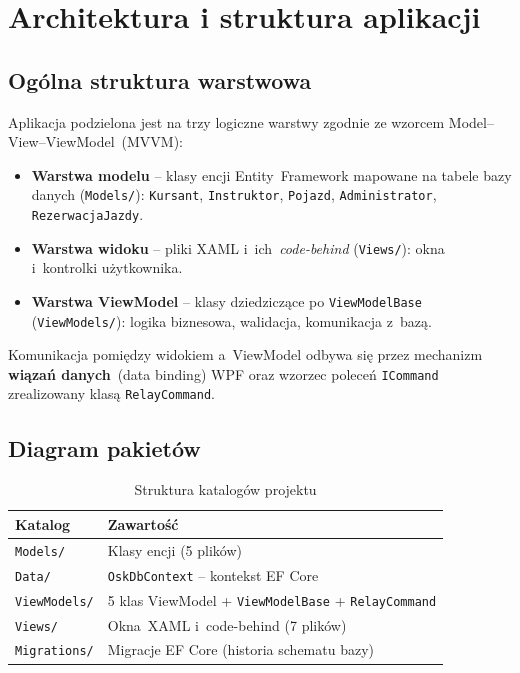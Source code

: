 \chapter{Architektura i struktura aplikacji}
\label{ch:architektura}

\section{Og\'{o}lna struktura warstwowa}

Aplikacja podzielona jest na trzy logiczne warstwy zgodnie ze wzorcem
Model--View--ViewModel~(MVVM):

\begin{itemize}
  \item \textbf{Warstwa modelu} -- klasy encji Entity~Framework mapowane na tabele bazy
        danych (\texttt{Models/}): \texttt{Kursant}, \texttt{Instruktor}, \texttt{Pojazd},
        \texttt{Administrator}, \texttt{RezerwacjaJazdy}.
  \item \textbf{Warstwa widoku} -- pliki XAML i~ich~\emph{code-behind} (\texttt{Views/}):
        okna i~kontrolki u\.{z}ytkownika.
  \item \textbf{Warstwa ViewModel} -- klasy dziedzicz\k{a}ce po \texttt{ViewModelBase}
        (\texttt{ViewModels/}): logika biznesowa, walidacja, komunikacja z~baz\k{a}.
\end{itemize}

Komunikacja pomi\k{e}dzy widokiem a~ViewModel odbywa si\k{e} przez mechanizm
\textbf{wi\k{a}za\'{n} danych}~(data binding) WPF oraz wzorzec polece\'{n}
\texttt{ICommand} zrealizowany klas\k{a} \texttt{RelayCommand}.

\section{Diagram pakiet\'{o}w}

\begin{table}[H]
\centering
\caption{Struktura katalog\'{o}w projektu}
\label{tab:struktura}
\begin{tabular}{|l|l|}
\hline
\textbf{Katalog} & \textbf{Zawarto\'{s}\'{c}} \\
\hline
\texttt{Models/}      & Klasy encji (5 plik\'{o}w) \\
\texttt{Data/}        & \texttt{OskDbContext} -- kontekst EF Core \\
\texttt{ViewModels/}  & 5 klas ViewModel + \texttt{ViewModelBase} + \texttt{RelayCommand} \\
\texttt{Views/}       & Okna~XAML i~code-behind (7 plik\'{o}w) \\
\texttt{Migrations/}  & Migracje EF Core (historia schematu bazy) \\
\hline
\end{tabular}
\end{table}


